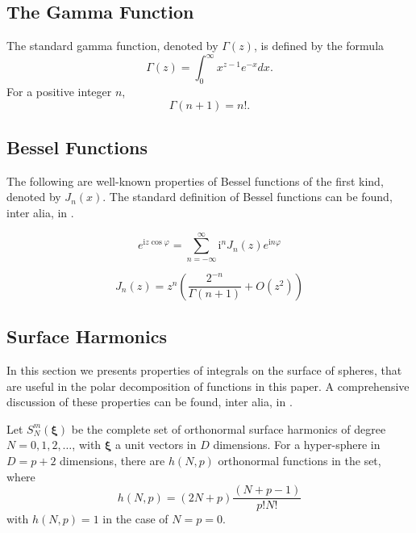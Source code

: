 \documentclass[12pt]{article}
\begin{document}
%
%
%
\subsection{The Gamma Function}

The standard gamma function, denoted by $\Gamma (z)$, is defined by the formula
\begin{equation}\label{eq:def:gammafunc}
  \Gamma(z) = \int_0^\infty x^{z-1} e^{-x} dx.
\end{equation}
For a positive integer $n$,
\begin{equation}
  \Gamma(n+1) = n!.
\end{equation}


%
%
%
\subsection{Bessel Functions}\label{sec:bessel}

The following are well-known properties of Bessel functions of the first kind, denoted by $J_n(x)$. 
The standard definition of Bessel functions can be found, inter alia, in \cite{abramowitz1964handbook}.


\begin{equation}
  e^{\mathrm{i} z \cos{\varphi}} = \sum_{n=-\infty}^\infty \mathrm{i}^n J_n(z) e^{\mathrm{i} n \varphi}
\end{equation}



\begin{equation}
 J_n(z) = z^n \left(\frac{2^{-n}}{\Gamma (n+1)}+O\left(z^2\right)\right)
\end{equation}

%
% 
%
\subsection{Surface Harmonics }\label{sec:surfaceharmonics}

In this section we presents properties of integrals on the surface of spheres, that are useful in the polar decomposition of functions
in this paper. A comprehensive discussion of these properties can be found, inter alia, in \cite{slepian1964prolate,serkh2015generalized}.

Let $S_N^m({\bm \xi})$ be the complete set of orthonormal surface harmonics of degree $N=0,1,2,\ldots$, with ${\bm \xi}$ a unit vectors in $D$ dimensions. 
For a hyper-sphere in $D=p+2$ dimensions, there are $h(N,p)$ orthonormal functions in the set, where
\begin{equation}\label{eq:def:hnp}
h(N,p) = (2N+p)\frac{(N+p-1)}{p! N!}
\end{equation}
with $h(N,p)=1$ in the case of $N=p=0$.
\end{document}
